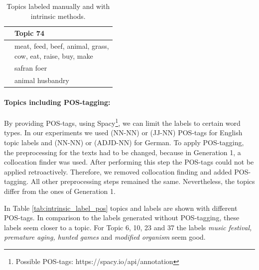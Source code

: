 {\begin{table}[h]
\begin{minipage}[t]{0.5\textwidth}
	\end{minipage}
	\begin{minipage}[t]{0.5\textwidth}
		\begin{tabular}{c|l}
			&Topic 74 \\
			\hline
			&\thead{meat, feed, beef, animal, grass,\\cow, eat, raise, buy, make} \\
			\hline
			&safran foer\\
			&animal husbandry	\\
		\end{tabular}
	\end{minipage}
	\caption[Labeled topics manually and with intrinsic method and ]{Topics labeled manually and with intrinsic methods.}
	\label{tab:extrinsic_manually}
\end{table}

\paragraph{Topics including POS-tagging:}

By providing \ac{POS}-tags, using Spacy\footnote{Possible POS-tags: https://spacy.io/api/annotation}, we can limit the labels to certain word types. In our experiments we used (NN-NN) or (JJ-NN) \ac{POS}-tags for English topic labels and (NN-NN) or (ADJD-NN) for German.  To apply \ac{POS}-tagging, the preprocessing for the texts had to be changed, because in Generation 1, a collocation finder was used. After performing this step the \ac{POS}-tags could not be applied retroactively. Therefore, we removed collocation finding and added \ac{POS}-tagging. All other preprocessing steps remained the same. Nevertheless, the topics differ from the ones of Generation 1. 

In Table \ref{tab:intrinsic_label_pos} topics and labels are shown with different \ac{POS}-tags. In comparison to the labels generated without \ac{POS}-tagging, these labels seem closer to a topic. For Topic 6, 10, 23 and 37 the labels \textit{music festival, premature aging, hunted games} and \textit{modified organism} seem good.

}
